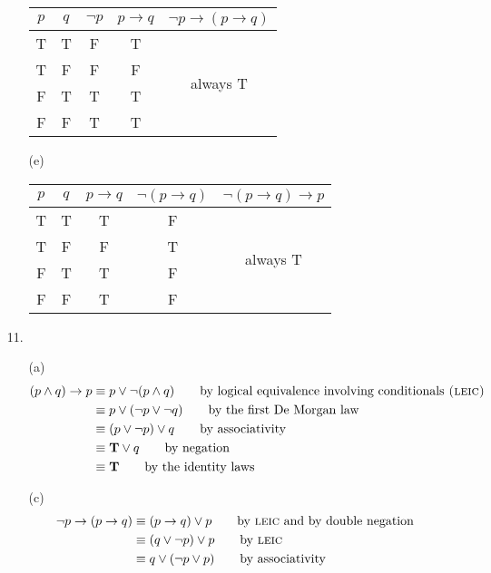 \documentclass{article}
\begin{document}
\begin{enumerate}
\begin{itemize}
\begin{tabular}{|c|c|c|c|c|}
        $p$ & $q$ & $\neg p$ & $p \rightarrow q$ & $\neg p \rightarrow (p \rightarrow q)$ \\\hline
        T & T & F & T & \multirow{4}{*}{always T} \\
        T & F & F & F & \\
        F & T & T & T & \\
        F & F & T & T & \\\hline
        \end{tabular}
        \item[(e)]\hfill
        \vspace{-0.1in}
        \newline
        \begin{tabular}{|c|c|c|c|c|}\hline
        $p$ & $q$ & $p \rightarrow q$ & $\neg(p \rightarrow q)$ & $\neg(p \rightarrow q) \rightarrow p$ \\\hline
        T & T & T & F & \multirow{4}{*}{always T} \\
        T & F & F & T & \\
        F & T & T & F & \\
        F & F & T & F & \\\hline
        \end{tabular}
    \end{itemize}
    \item[11.]
    \begin{itemize}
        \item[(a)]
        \begin{align*}
        (p \land q) \rightarrow p &\equiv p \lor \neg (p \land q) \tag*{by logical equivalence involving conditionals \textsc{(leic)}}\\
        &\equiv p \lor (\neg p \lor \neg q) \tag*{by the first De Morgan law}\\
        &\equiv (p \lor \neg p) \lor q \tag*{by associativity}\\
        &\equiv \mathbf{T} \lor q \tag*{by negation}\\
        &\equiv \mathbf{T} \tag*{by the identity laws}
        \end{align*}
        \item[(c)]
        \begin{align*}
        \neg p \rightarrow (p \rightarrow q) &\equiv (p \rightarrow q) \lor p \tag*{by \textsc{leic} and by double negation}\\
        &\equiv (q \lor \neg p) \lor p \tag*{by \textsc{leic}}\\
        &\equiv q \lor (\neg p \lor p) \tag*{by associativity}\\

\end{align*}
\end{itemize}
\end{enumerate}
\end{document}
